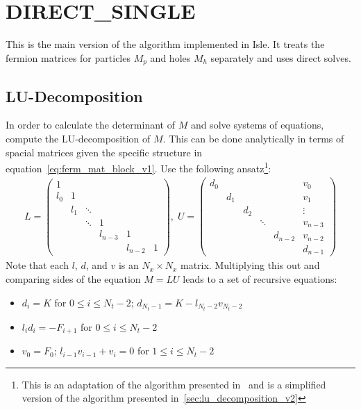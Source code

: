\documentclass[a4paper, fleqn, twoside, notitlepage]{scrartcl}
\begin{document}
\section{DIRECT\_SINGLE}\label{sec:direct_square}

This is the main version of the algorithm implemented in Isle.
It treats the fermion matrices for particles $M_p$ and holes $M_h$ separately and uses direct solves.

\subsection{LU-Decomposition}\label{sec:lu_v1}

In order to calculate the determinant of $M$ and solve systems of equations, compute the LU-decomposition of $M$. This can be done analytically in terms of spacial matrices given the specific structure in equation~\eqref{eq:ferm_mat_block_v1}.
Use the following ansatz\footnote{This is an adaptation of the algorithm presented in~\cite{zivkovic:2013} and is a simplified version of the algorithm presented in~\cref{sec:lu_decomposition_v2}}:
\begin{align}
  L =
  \begin{pmatrix}
    1   &     &    &        &        &\\
    l_0 & 1   &    &        &        &\\
        & l_1 & \ddots &        &        &\\
        &     & \ddots & 1      &        &\\
        &     &   & l_{n-3} & 1      &\\
        &     &   &        & l_{n-2} & 1
  \end{pmatrix},
  \; U =
  \begin{pmatrix}
    d_0 &     &      &   &        & v_0\\
        & d_1 &     &    &        & v_1\\
        &     & d_2 &    &        & \vdots \\
        &     &     & \ddots &        & v_{n-3} \\
        &     &     &    & d_{n-2} & v_{n-2} \\
        &     &     &    &        & d_{n-1}
  \end{pmatrix}
\end{align}
Note that each $l$, $d$, and $v$ is an $N_x \times N_x$ matrix. Multiplying this out and comparing sides of the equation $M = LU$ leads to a set of recursive equations:
\begin{itemize}
\item $d_i = K$ for $0 \le i \le N_t-2$;\hspace{2em} $d_{N_t-1} = K - l_{N_t-2}v_{N_t-2}$
\item $l_i d_i = -F_{i+1}$ for $0 \le i \le N_t-2$
\item $v_0 = F_0$;\hspace{2em} $l_{i-1} v_{i-1} + v_i = 0$ for $1 \le i \le N_t-2$
\end{itemize}
\end{document}
